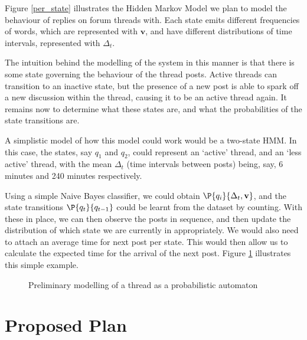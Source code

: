 \documentclass[]{homework}
\begin{document}
Figure \ref{per_state} illustrates the Hidden Markov Model we plan to model the 
behaviour of replies on forum threads with. Each state emits different 
frequencies of words, which are represented with $\mathbf{v}$, and have 
different distributions of time intervals, represented with $\Delta_t$.

The intuition behind the modelling of the system in this manner is that there is 
some state governing the behaviour of the thread posts. Active threads can 
transition to an inactive state, but the presence of a new post is able to spark 
off a new discussion within the thread, causing it to be an active thread again.
It remains now to determine what these states are, and what the probabilities of 
the state transitions are.

A simplistic model of how this model could work would be a two-state HMM. In 
this case, the states, say $q_1$ and $q_2$, could represent an `active' thread, 
and an `less active' thread, with the mean $\Delta_t$ (time intervals between 
posts) being, say, 6 minutes and 240 minutes respectively.

Using a simple Naive Bayes classifier, we could obtain 
$\P{q_i}{\Delta_t,\mathbf{v}}$, and the state transitions $\P{q_t}{q_{t-1}}$	
could be learnt from the dataset by counting. With these in place, we can then 
observe the posts in sequence, and then update the distribution of which state 
we are currently in appropriately. We would also need to attach an average time 
for next post per state. This would then allow us to calculate the expected time 
for the arrival of the next post. Figure \ref{spaceship} illustrates this simple 
example.

\begin{figure}
	\begin{center}
		
	\end{center}
	\caption{Preliminary modelling of a thread as a probabilistic 
	automaton}\label{spaceship}
\end{figure}


\section{Proposed Plan}\label{prop_plan}
\end{document}
